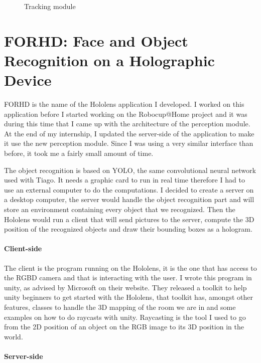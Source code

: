 \documentclass[a4paper, twocolumn]{article}
\begin{document}
    \begin{figure}
        \resizebox{\textwidth}{!}{}
        \caption{Tracking module}
        \label{tracker_module}
    \end{figure}
    
    \section{FORHD: Face and Object Recognition on a Holographic Device}
    
    FORHD is the name of the Hololens application I developed. I worked on this application before I started working on the Robocup@Home project and it was during this time that I came up with the architecture of the perception module. At the end of my internship, I updated the server-side of the application to make it use the new perception module. Since I was using a very similar interface than before, it took me a fairly small amount of time.
    
    The object recognition is based on YOLO, the same convolutional neural network used with Tiago. It needs a graphic card to run in real time therefore I had to use an external computer to do the computations. I decided to create a server on a desktop computer, the server would handle the object recognition part and will store an environment containing every object that we recognized. Then the Hololens would run a client that will send pictures to the server, compute the 3D position of the recognized objects and draw their bounding boxes as a hologram.
    
    \paragraph{Client-side}
    
    The client is the program running on the Hololens, it is the one that has access to the RGBD camera and that is interacting with the user. I wrote this program in unity, as advised by Microsoft on their website. They released a toolkit to help unity beginners to get started with the Hololens, that toolkit has, amongst other features, classes to handle the 3D mapping of the room we are in and some examples on how to do raycasts with unity. Raycasting is the tool I used to go from the 2D position of an object on the RGB image to its 3D position in the world.
    
    \paragraph{Server-side}
    
\end{document}
